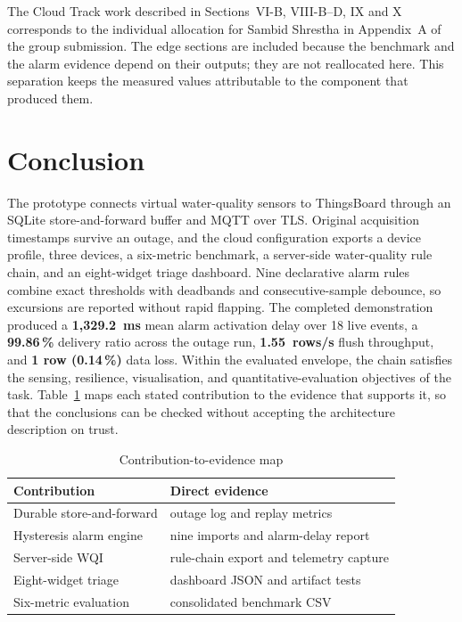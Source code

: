 \documentclass[conference]{IEEEtran}
\begin{document}
The Cloud Track work described in Sections~VI-B, VIII-B--D, IX and X corresponds
to the individual allocation for Sambid Shrestha in Appendix~A of the group
submission. The edge sections are included because the benchmark and the alarm
evidence depend on their outputs; they are not reallocated here. This separation
keeps the measured values attributable to the component that produced them.

\section{Conclusion}
\label{sec:conclusion}

The prototype connects virtual water-quality sensors to ThingsBoard through an SQLite
store-and-forward buffer and MQTT over TLS. Original acquisition timestamps survive an
outage, and the cloud configuration exports a device profile, three devices, a
six-metric benchmark, a server-side water-quality rule chain, and an eight-widget triage
dashboard. Nine declarative alarm rules combine exact thresholds with deadbands and
consecutive-sample debounce, so excursions are reported without rapid flapping. The
completed demonstration produced a \textbf{1,329.2~ms} mean alarm activation delay over 18
live events, a \textbf{99.86\,\%} delivery ratio across the outage run,
\textbf{1.55~rows/s} flush throughput, and \textbf{1 row (0.14\,\%)} data loss. Within the
evaluated envelope, the chain satisfies the
sensing, resilience, visualisation, and quantitative-evaluation objectives of the task.
Table~\ref{tab:claims} maps each stated contribution to the evidence that
supports it, so that the conclusions can be checked without accepting the
architecture description on trust.

\begin{table}[t]
\caption{Contribution-to-evidence map}
\label{tab:claims}
\centering
\scriptsize
\begin{tabular}{@{}ll@{}}
\toprule
Contribution & Direct evidence \\
\midrule
Durable store-and-forward & outage log and replay metrics \\
Hysteresis alarm engine & nine imports and alarm-delay report \\
Server-side WQI & rule-chain export and telemetry capture \\
Eight-widget triage & dashboard JSON and artifact tests \\
Six-metric evaluation & consolidated benchmark CSV \\
\bottomrule
\end{tabular}
\end{table}
\end{document}
